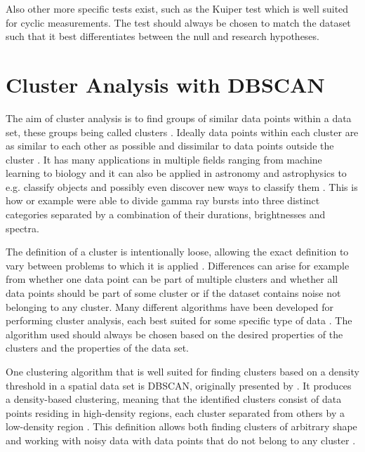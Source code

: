 \documentclass[english, twoside]{HYgradu}
\begin{document}
Also other more specific tests exist, such as the Kuiper test which is well suited for cyclic measurements. The test should always be chosen to match the dataset such that it best differentiates between the null and research hypotheses.

\section{Cluster Analysis with DBSCAN} \label{sect:cluster-analysis}
The aim of cluster analysis is to find groups of similar data points within a data set, these groups being called clusters \citep{han2000data}. Ideally data points within each cluster are as similar to each other as possible and dissimilar to data points outside the cluster \citep{han2000data}. It has many applications in multiple fields ranging from machine learning to biology and it can also be applied in astronomy and astrophysics to e.g. classify objects and possibly even discover new ways to classify them \citep{ball2010data, han2000data}. This is how or example \citet{mukherjee1998three} were able to divide gamma ray bursts into three distinct categories separated by a combination of their durations, brightnesses and spectra.

The definition of a cluster is intentionally loose, allowing the exact definition to vary between problems to which it is applied \citep{tan2006introduction}. Differences can arise for example from whether one data point can be part of multiple clusters and whether all data points should be part of some cluster or if the dataset contains noise not belonging to any cluster. Many different algorithms have been developed for performing cluster analysis, each best suited for some specific type of data \citep{han2000data}. The algorithm used should always be chosen based on the desired properties of the clusters and the properties of the data set.

One clustering algorithm that is well suited for finding clusters based on a density threshold in a spatial data set is DBSCAN, originally presented by \citet{ester1996density}. It produces a density-based clustering, meaning that the identified clusters consist of data points residing in high-density regions, each cluster separated from others by a low-density region \citep{han2000data}. This definition allows both finding clusters of arbitrary shape and working with noisy data with data points that do not belong to any cluster \citep{ester1996density}.
\end{document}
